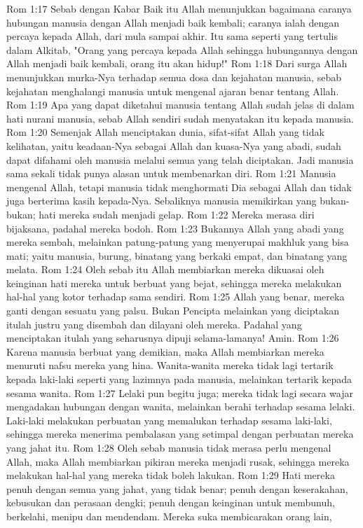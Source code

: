 Rom 1:17  Sebab dengan Kabar Baik itu Allah menunjukkan bagaimana caranya hubungan manusia dengan Allah menjadi baik kembali; caranya ialah dengan percaya kepada Allah, dari mula sampai akhir. Itu sama seperti yang tertulis dalam Alkitab, "Orang yang percaya kepada Allah sehingga hubungannya dengan Allah menjadi baik kembali, orang itu akan hidup!"
Rom 1:18  Dari surga Allah menunjukkan murka-Nya terhadap semua dosa dan kejahatan manusia, sebab kejahatan menghalangi manusia untuk mengenal ajaran benar tentang Allah.
Rom 1:19  Apa yang dapat diketahui manusia tentang Allah sudah jelas di dalam hati nurani manusia, sebab Allah sendiri sudah menyatakan itu kepada manusia.
Rom 1:20  Semenjak Allah menciptakan dunia, sifat-sifat Allah yang tidak kelihatan, yaitu keadaan-Nya sebagai Allah dan kuasa-Nya yang abadi, sudah dapat difahami oleh manusia melalui semua yang telah diciptakan. Jadi manusia sama sekali tidak punya alasan untuk membenarkan diri.
Rom 1:21  Manusia mengenal Allah, tetapi manusia tidak menghormati Dia sebagai Allah dan tidak juga berterima kasih kepada-Nya. Sebaliknya manusia memikirkan yang bukan-bukan; hati mereka sudah menjadi gelap.
Rom 1:22  Mereka merasa diri bijaksana, padahal mereka bodoh.
Rom 1:23  Bukannya Allah yang abadi yang mereka sembah, melainkan patung-patung yang menyerupai makhluk yang bisa mati; yaitu manusia, burung, binatang yang berkaki empat, dan binatang yang melata.
Rom 1:24  Oleh sebab itu Allah membiarkan mereka dikuasai oleh keinginan hati mereka untuk berbuat yang bejat, sehingga mereka melakukan hal-hal yang kotor terhadap sama sendiri.
Rom 1:25  Allah yang benar, mereka ganti dengan sesuatu yang palsu. Bukan Pencipta melainkan yang diciptakan itulah justru yang disembah dan dilayani oleh mereka. Padahal yang menciptakan itulah yang seharusnya dipuji selama-lamanya! Amin.
Rom 1:26  Karena manusia berbuat yang demikian, maka Allah membiarkan mereka menuruti nafsu mereka yang hina. Wanita-wanita mereka tidak lagi tertarik kepada laki-laki seperti yang lazimnya pada manusia, melainkan tertarik kepada sesama wanita.
Rom 1:27  Lelaki pun begitu juga; mereka tidak lagi secara wajar mengadakan hubungan dengan wanita, melainkan berahi terhadap sesama lelaki. Laki-laki melakukan perbuatan yang memalukan terhadap sesama laki-laki, sehingga mereka menerima pembalasan yang setimpal dengan perbuatan mereka yang jahat itu.
Rom 1:28  Oleh sebab manusia tidak merasa perlu mengenal Allah, maka Allah membiarkan pikiran mereka menjadi rusak, sehingga mereka melakukan hal-hal yang mereka tidak boleh lakukan.
Rom 1:29  Hati mereka penuh dengan semua yang jahat, yang tidak benar; penuh dengan keserakahan, kebusukan dan perasaan dengki; penuh dengan keinginan untuk membunuh, berkelahi, menipu dan mendendam. Mereka suka membicarakan orang lain,
